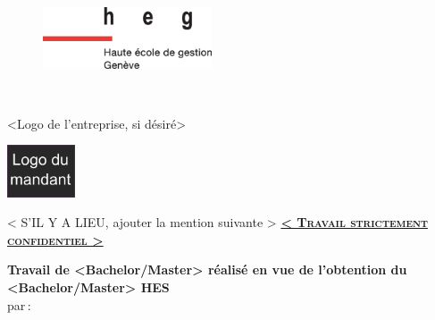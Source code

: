 
\makeatletter	%
	\begin{titlepage}

		\begin{figure}[H]
			\includegraphics[width=5cm]{images/heg-logo.eps}
		\end{figure}
	
		\begin{center}
			
			{\LARGE \textbf{\@title}} \\

			\vspace{1cm}
			
			<Logo de l'entreprise, si désiré>\\	%
			
			\vspace{.2cm}
			
			\includegraphics[width=2cm]{images/logo-mandant.png}
			
			\vspace{1cm}
			\vfill
		
			{\large < S'IL Y A LIEU, ajouter la mention suivante >}
				\textbf{\Large{ \textsc{ \underline{< Travail strictement confidentiel >}}}}\\

			\vspace{2cm}

			\textbf{Travail de <Bachelor/Master> réalisé en vue de l’obtention du <Bachelor/Master> HES}\\
				par\textbf{\,}:\\
				{\large \@author} \\


\end{center}
\end{titlepage}
